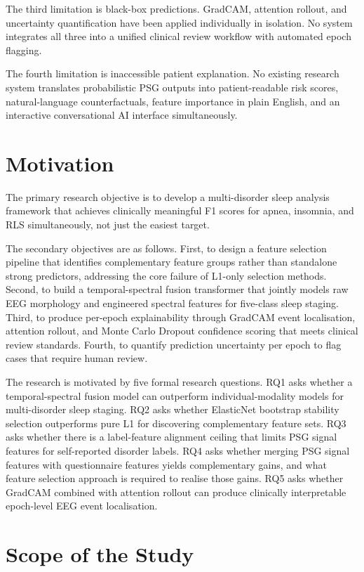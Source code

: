 The third limitation is black-box predictions. GradCAM, attention rollout, and uncertainty quantification have been applied individually in isolation. No system integrates all three into a unified clinical review workflow with automated epoch flagging.

The fourth limitation is inaccessible patient explanation. No existing research system translates probabilistic PSG outputs into patient-readable risk scores, natural-language counterfactuals, feature importance in plain English, and an interactive conversational AI interface simultaneously.

\section{Motivation}

The primary research objective is to develop a multi-disorder sleep analysis framework that achieves clinically meaningful F1 scores for apnea, insomnia, and RLS simultaneously, not just the easiest target.

The secondary objectives are as follows. First, to design a feature selection pipeline that identifies complementary feature groups rather than standalone strong predictors, addressing the core failure of L1-only selection methods. Second, to build a temporal-spectral fusion transformer that jointly models raw EEG morphology and engineered spectral features for five-class sleep staging. Third, to produce per-epoch explainability through GradCAM event localisation, attention rollout, and Monte Carlo Dropout confidence scoring that meets clinical review standards. Fourth, to quantify prediction uncertainty per epoch to flag cases that require human review.

The research is motivated by five formal research questions. RQ1 asks whether a temporal-spectral fusion model can outperform individual-modality models for multi-disorder sleep staging. RQ2 asks whether ElasticNet bootstrap stability selection outperforms pure L1 for discovering complementary feature sets. RQ3 asks whether there is a label-feature alignment ceiling that limits PSG signal features for self-reported disorder labels. RQ4 asks whether merging PSG signal features with questionnaire features yields complementary gains, and what feature selection approach is required to realise those gains. RQ5 asks whether GradCAM combined with attention rollout can produce clinically interpretable epoch-level EEG event localisation.

\section{Scope of the Study}

